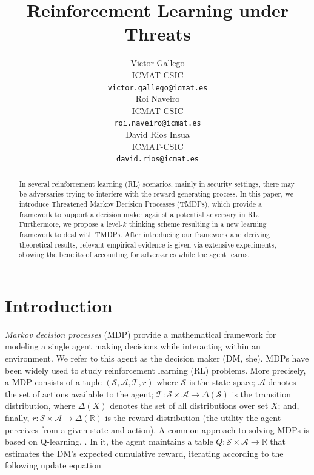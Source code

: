 \documentclass[letterpaper]{article} %
\begin{document}
\title{Reinforcement Learning under Threats}
\author{
Victor Gallego \\
  ICMAT-CSIC \\
  \texttt{victor.gallego@icmat.es} \\
   \And
   Roi Naveiro \\
  ICMAT-CSIC \\
   \texttt{roi.naveiro@icmat.es} \\
   \And
   David Rios Insua \\
   ICMAT-CSIC \\
   \texttt{david.rios@icmat.es} \\
}
\maketitle
\begin{abstract}
In several reinforcement learning (RL) scenarios,
mainly in security settings,
there may be adversaries trying to interfere with the reward generating process.
In this paper, we introduce Threatened Markov Decision Processes (TMDPs),
which provide a framework to support a decision maker against a potential adversary
in RL. Furthermore, we propose a level-$k$ thinking scheme
resulting in a new learning framework to deal with TMDPs. After introducing our framework and
deriving theoretical
results, relevant empirical evidence is given via extensive experiments,
showing the benefits of accounting for adversaries while the agent learns.
\end{abstract}

\section{Introduction}

\textit{Markov decision processes} (MDP) \cite{howard:dp} provide
a mathematical framework for modeling a single agent making decisions
while interacting within an environment. We refer to this agent as the
decision maker (DM, she). MDPs have been widely used to study
reinforcement learning (RL) problems. More precisely, a MDP consists of a tuple $\left( \mathcal{S}, \mathcal{A}, \mathcal{T}, r\right)$ where $\mathcal{S}$ is the state space; $\mathcal{A}$ denotes the set of actions available to the agent; $\mathcal{T}: \mathcal{S} \times \mathcal{A} \rightarrow \Delta (\mathcal{S})$ is the transition distribution, where $\Delta(X)$ denotes the set of all distributions over set $X$;
and, finally, $r : \mathcal{S} \times \mathcal{A}  \rightarrow \Delta(\mathbb{R}) $
is the reward distribution (the utility the agent perceives from a given state
and action). A common approach to solving MDPs is based on Q-learning, \cite{sutton1998reinforcement}.
In it, the agent maintains a table $Q : \mathcal{S} \times \mathcal{A} \rightarrow \mathbb{R}$ that estimates the DM's expected cumulative reward,
iterating according to the following update equation
\end{document}
